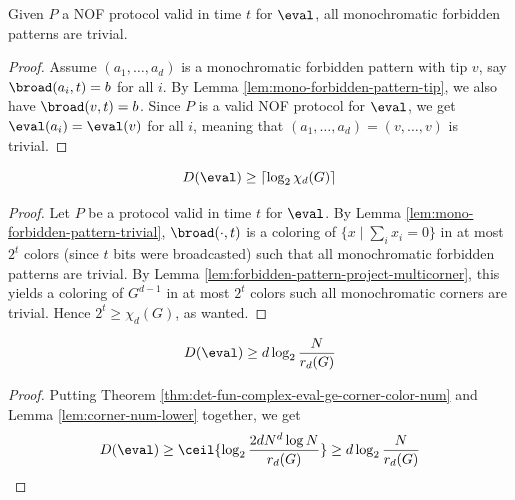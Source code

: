\begin{lemma}
  \label{lem:mono-forbidden-pattern-trivial}
  \leanok

  Given $P$ a NOF protocol valid in time $t$ for $\eval$, all monochromatic forbidden patterns are trivial.
\end{lemma}
\begin{proof}
  \leanok

  Assume $(a_1, \dots, a_d)$ is a monochromatic forbidden pattern with tip $v$, say $\broad(a_i, t) = b$ for all $i$. By Lemma \ref{lem:mono-forbidden-pattern-tip}, we also have $\broad(v, t) = b$. Since $P$ is a valid NOF protocol for $\eval$, we get $\eval(a_i) = \eval(v)$ for all $i$, meaning that $(a_1, \dots, a_d) = (v, \dots, v)$ is trivial.
\end{proof}

\begin{theorem}
  \label{thm:det-fun-complex-eval-ge-corner-color-num}

  $$D(\eval) \ge \lceil\log_2\chi_d(G)\rceil$$
\end{theorem}
\begin{proof}

  Let $P$ be a protocol valid in time $t$ for $\eval$. By Lemma \ref{lem:mono-forbidden-pattern-trivial}, $\broad(\cdot, t)$ is a coloring of $\{x \mid \sum_i x_i = 0\}$ in at most $2^t$ colors (since $t$ bits were broadcasted) such that all monochromatic forbidden patterns are trivial. By Lemma \ref{lem:forbidden-pattern-project-multicorner}, this yields a coloring of $G^{d - 1}$ in at most $2^t$ colors such all monochromatic corners are trivial. Hence $2^t \ge \chi_d(G)$, as wanted.
\end{proof}

\begin{corollary}
  \label{cor:det-fun-complex-eval-ge-corner-free-num}

  $$D(\eval) \ge d\log_2\frac N{r_d(G)}$$
\end{corollary}
\begin{proof}

  Putting Theorem \ref{thm:det-fun-complex-eval-ge-corner-color-num} and Lemma \ref{lem:corner-num-lower} together, we get
  $$D(\eval) \ge \ceil{\log_2\frac{2dN^d\log N}{r_d(G)}} \ge d\log_2\frac N{r_d(G)}$$
\end{proof}


